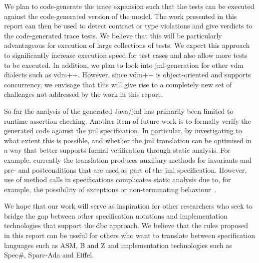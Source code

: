 We plan to code-generate the trace expansion such that the 
tests can be executed against the code-generated version of the
model. The work presented in this report can then be used to detect
contract or type violations and give verdicts to the code-generated
trace tests. We believe that this will be particularly advantageous
for execution of large collections of tests. We expect this approach
to significantly increase execution speed for test cases and also
allow more tests to be executed. In addition, we plan to look into
\ac{jml}-generation for other \ac{vdm} dialects such as
\ac{vdm}++. However, since \ac{vdm}++ is object-oriented and supports
concurrency, we envisage that this will give rise to a completely new
set of challenges not addressed by the work in this report.

So far the analysis of the generated Java/\ac{jml} has primarily been
limited to runtime assertion checking. Another item of future work is
to formally verify the generated code against the \ac{jml}
specification. In particular, by investigating to what extent this is
possible, and whether the \ac{jml} translation can be optimised in a
way that better supports formal verification through static
analysis. For example, currently the translation produces auxiliary
methods for invariants and pre- and postconditions that are used as
part of the \ac{jml} specification. However, use of method calls in
specifications complicates static analysis due to, for example, the
possibility of exceptions or non-terminating behaviour~\cite{Cok05}.
  
We hope that our work will serve as inspiration for other researchers
who seek to bridge the gap between other specification notations and
implementation technologies that support the \ac{dbc} approach. We
believe that the rules proposed in this report can be useful for others
who want to translate between specification languages such as ASM, B
and Z and implementation technologies such as Spec\#, Sparc-Ada and
Eiffel.



